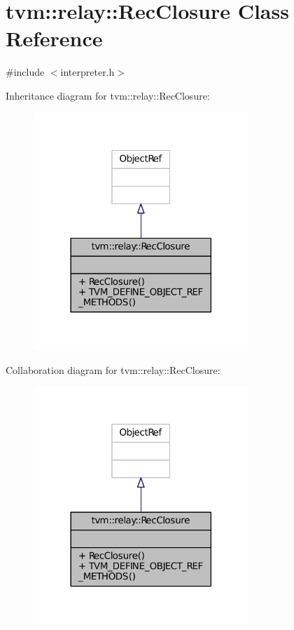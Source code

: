 \hypertarget{classtvm_1_1relay_1_1RecClosure}{}\section{tvm\+:\+:relay\+:\+:Rec\+Closure Class Reference}
\label{classtvm_1_1relay_1_1RecClosure}


{\ttfamily \#include $<$interpreter.\+h$>$}



Inheritance diagram for tvm\+:\+:relay\+:\+:Rec\+Closure\+:
\nopagebreak
\begin{figure}[H]
\begin{center}
\leavevmode
\includegraphics[width=230pt]{classtvm_1_1relay_1_1RecClosure__inherit__graph}
\end{center}
\end{figure}


Collaboration diagram for tvm\+:\+:relay\+:\+:Rec\+Closure\+:
\nopagebreak
\begin{figure}[H]
\begin{center}
\leavevmode
\includegraphics[width=230pt]{classtvm_1_1relay_1_1RecClosure__coll__graph}
\end{center}
\end{figure}
